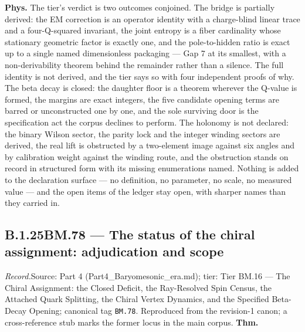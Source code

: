 \documentclass[11pt,openany]{report}
\theoremstyle{canonplain}
\theoremstyle{canondef}
\begin{document}
\textbf{Phys.} The tier's verdict is two outcomes conjoined. The bridge is partially derived: the EM correction is an operator identity with a charge-blind linear trace and a four-Q-squared invariant, the joint entropy is a fiber cardinality whose stationary geometric factor is exactly one, and the pole-to-hidden ratio is exact up to a single named dimensionless packaging — Gap 7 at its smallest, with a non-derivability theorem behind the remainder rather than a silence. The full identity is not derived, and the tier says so with four independent proofs of why. The beta decay is closed: the daughter floor is a theorem wherever the Q-value is formed, the margins are exact integers, the five candidate opening terms are barred or unconstructed one by one, and the sole surviving door is the specification act the corpus declines to perform. The holonomy is not declared: the binary Wilson sector, the parity lock and the integer winding sectors are derived, the real lift is obstructed by a two-element image against six angles and by calibration weight against the winding route, and the obstruction stands on record in structured form with its missing enumerations named. Nothing is added to the declaration surface — no definition, no parameter, no scale, no measured value — and the open items of the ledger stay open, with sharper names than they carried in.

\medskip
\subsection*{\texorpdfstring{B.1.25\quad BM.78 — The status of the chiral assignment: adjudication and scope}{BM.78 B.1.25}}
\label{tag:BM-78}
{\small \textit{Record.}\quad Source: Part 4 (Part4\_Baryomesonic\_era.md); tier: Tier BM.16 — The Chiral Assignment: the Closed Deficit, the Ray-Resolved Spin Census, the Attached Quark Splitting, the Chiral Vertex Dynamics, and the Specified Beta-Decay Opening; canonical tag \texttt{BM.78}. Reproduced from the revision-1 canon; a cross-reference stub marks the former locus in the main corpus.}
\medskip
\textbf{Thm.}
\end{document}
